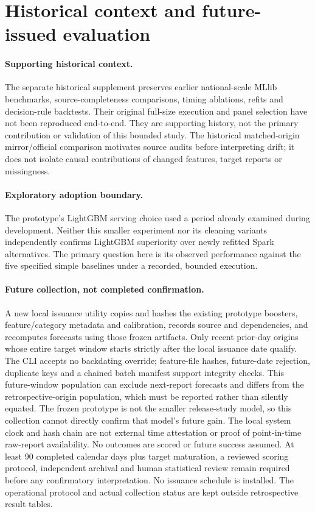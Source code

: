 \section{Historical context and future-issued evaluation}\label{sec:prospective}
\paragraph{Supporting historical context.}
The separate historical supplement preserves earlier national-scale MLlib benchmarks, source-completeness comparisons, timing ablations, refits and decision-rule backtests. Their original full-size execution and panel selection have not been reproduced end-to-end. They are supporting history, not the primary contribution or validation of this bounded study. The historical matched-origin mirror/official comparison motivates source audits before interpreting drift; it does not isolate causal contributions of changed features, target reports or missingness.

\paragraph{Exploratory adoption boundary.}
The prototype's LightGBM serving choice used a period already examined during development. Neither this smaller experiment nor its cleaning variants independently confirms LightGBM superiority over newly refitted Spark alternatives. The primary question here is its observed performance against the five specified simple baselines under a recorded, bounded execution.

\paragraph{Future collection, not completed confirmation.}
A new local issuance utility copies and hashes the existing prototype boosters, feature/category metadata and calibration, records source and dependencies, and recomputes forecasts using those frozen artifacts. Only recent prior-day origins whose entire target window starts strictly after the local issuance date qualify. The CLI accepts no backdating override; feature-file hashes, future-date rejection, duplicate keys and a chained batch manifest support integrity checks. This future-window population can exclude next-report forecasts and differs from the retrospective-origin population, which must be reported rather than silently equated.
The frozen prototype is not the smaller release-study model, so this collection cannot directly confirm that model's future gain. The local system clock and hash chain are not external time attestation or proof of point-in-time raw-report availability. No outcomes are scored or future success assumed. At least 90 completed calendar days plus target maturation, a reviewed scoring protocol, independent archival and human statistical review remain required before any confirmatory interpretation. No issuance schedule is installed. The operational protocol and actual collection status are kept outside retrospective result tables.
